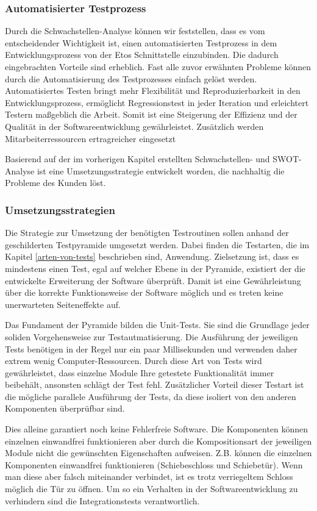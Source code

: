 \subsubsection{Automatisierter Testprozess}
Durch die Schwachstellen-Analyse können wir feststellen, dass es vom entscheidender Wichtigkeit ist, einen automatisierten Testprozess in dem Entwicklungsprozess von der Etos Schnittstelle einzubinden. Die dadurch eingebrachten Vorteile sind erheblich. Fast alle zuvor erwähnten Probleme können durch die Automatisierung des Testprozesses einfach gelöst werden. Automatisiertes Testen bringt mehr Flexibilität und Reproduzierbarkeit in den Entwicklungsprozess, ermöglicht Regressionstest in jeder Iteration und erleichtert Testern maßgeblich die Arbeit. Somit ist eine Steigerung der Effizienz und der Qualität in der Softwareentwicklung gewährleistet. Zusätzlich werden Mitarbeiterressourcen ertragreicher eingesetzt

Basierend auf der im vorherigen Kapitel erstellten Schwachstellen- und SWOT-Analyse ist eine Umsetzungsstrategie entwickelt worden, die nachhaltig die Probleme des Kunden löst.

\subsubsection{Umsetzungsstrategien}
Die Strategie zur Umsetzung der benötigten Testroutinen sollen anhand der geschilderten Testpyramide umgesetzt werden. Dabei finden die Testarten, die im Kapitel \ref{arten-von-tests} beschrieben sind, Anwendung. Zielsetzung ist, dass es mindestens einen Test, egal auf welcher Ebene in der Pyramide, existiert der die entwickelte Erweiterung der Software überprüft. Damit ist eine Gewährleistung über die korrekte Funktionsweise der Software möglich und es treten keine unerwarteten Seiteneffekte auf.

Das Fundament der Pyramide bilden die Unit-Tests. Sie sind die Grundlage jeder soliden Vorgehensweise zur Testautmatisierung. Die Ausführung der jeweiligen Tests benötigen in der Regel nur ein paar Millisekunden und verwenden daher extrem wenig Computer-Ressourcen. Durch diese Art von Tests wird gewährleistet, dass einzelne Module Ihre getestete Funktionalität immer beibehält, ansonsten schlägt der Test fehl. Zusätzlicher Vorteil dieser Testart ist die mögliche parallele Ausführung der Tests, da diese isoliert von den anderen Komponenten überprüfbar sind.

Dies alleine garantiert noch keine Fehlerfreie Software. Die Komponenten können einzelnen einwandfrei funktionieren aber durch die Kompositionsart der jeweiligen Module nicht die gewünschten Eigenschaften aufweisen. Z.B. können die einzelnen Komponenten einwandfrei funktionieren (Schiebeschloss und Schiebetür). Wenn man diese aber falsch miteinander verbindet, ist es trotz verriegeltem Schloss möglich die Tür zu öffnen. Um so ein Verhalten in der Softwareentwicklung zu verhindern sind die Integrationstests verantwortlich. 


